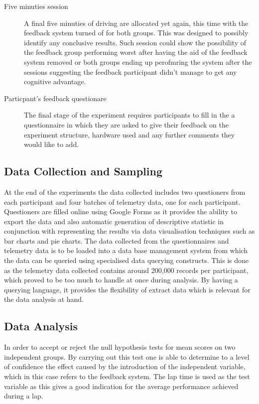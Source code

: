\begin{description}
	\item[Five minuties session] A final five minuties of driving are allocated yet again, this time with the feedback system turned of for both groups. This was designed to possibly identify any conclusive results. Such session could show the possibility of the feedback group performing worst after having the aid of the feedback system removed or both groups ending up perofmring the system after the sessions suggesting the feedback participant didn't manage to get any cognitive advantage.
	
	\item[Particpant's feedback questionare] The final stage of the experiment requires participants to fill in the a questionnaire  in which they are asked to give their feedback on the experiment structure, hardware used and any further comments they would like to add.
	
\end{description}

\subsection{Data Collection and Sampling}
\label{sec:meth-data-gathering}
At the end of the experiments the data collected includes two questioners from each participant and four batches of telemetry data, one for each participant. Questioners are filled online using Google Forms as it provides the ability to export the data and also automatic generation of descriptive statistic in conjunction with representing the results via data visualisation techniques such as bar charts and pie charts. The data collected from the questionnaires and telemetry data is to be loaded into a data base management system from which the data can be queried using specialised data querying constructs. This is done as the telemetry data collected contains around 200,000 records per participant, which proved to be too much to handle at once during analysis. By having a querying language, it provides the flexibility of extract data which is relevant for the data analysis at hand.

\subsection{Data Analysis}
\label{sec:meth-data-analysis}
In order to accept or reject the null hypothesis tests for mean scores on two independent groups. By carrying out this test one is able to determine to a level of confidence the effect caused by the introduction of the independent variable, which in this case refers to the feedback system. The lap time is used as the test variable as this gives a good indication for the average performance achieved during a lap. 


